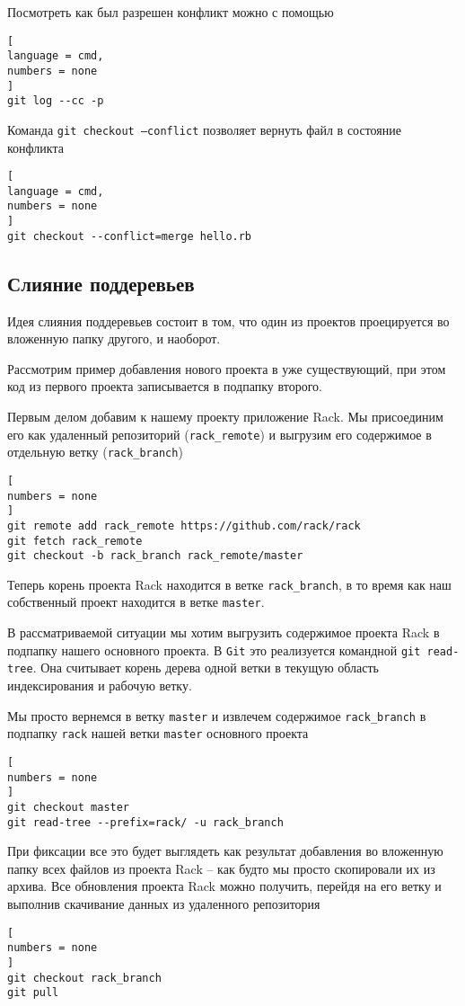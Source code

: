 \documentclass[%
	11pt,
	a4paper,
	utf8,
		]{article}
\begin{document}
Посмотреть как был разрешен конфликт можно с помощью 
\begin{lstlisting}[
language = cmd,
numbers = none
]
git log --cc -p
\end{lstlisting}

Команда \texttt{git checkout --conflict} позволяет вернуть файл в состояние конфликта
\begin{lstlisting}[
language = cmd,
numbers = none
]
git checkout --conflict=merge hello.rb
\end{lstlisting}

\subsection{Слияние поддеревьев}

Идея слияния поддеревьев состоит в том, что один из проектов проецируется во вложенную папку другого, и наоборот.

Рассмотрим пример добавления нового проекта в уже существующий, при этом код из первого проекта записывается в подпапку второго.

Первым делом добавим к нашему проекту приложение Rack. Мы присоединим его как удаленный репозиторий (\texttt{rack\_remote}) и выгрузим его содержимое в отдельную ветку (\texttt{rack\_branch})
\begin{lstlisting}[
numbers = none
]
git remote add rack_remote https://github.com/rack/rack
git fetch rack_remote
git checkout -b rack_branch rack_remote/master
\end{lstlisting}

Теперь корень проекта Rack находится в ветке \texttt{rack\_branch}, в то время как наш собственный проект находится в ветке \texttt{master}.

В рассматриваемой ситуации мы хотим выгрузить содержимое проекта Rack в подпапку нашего основного проекта. В \texttt{Git} это реализуется командной \texttt{git read-tree}. Она считывает корень дерева одной ветки в текущую область индексирования и рабочую ветку.

Мы просто вернемся в ветку \texttt{master} и извлечем содержимое \texttt{rack\_branch} в подпапку \texttt{rack} нашей ветки \texttt{master} основного проекта
\begin{lstlisting}[
numbers = none
]
git checkout master
git read-tree --prefix=rack/ -u rack_branch
\end{lstlisting}

При фиксации все это будет выглядеть как результат добавления во вложенную папку всех файлов из проекта Rack -- как будто мы просто скопировали их из архива. Все обновления проекта Rack можно получить, перейдя на его ветку и выполнив скачивание данных из удаленного репозитория
\begin{lstlisting}[
numbers = none
]
git checkout rack_branch
git pull
\end{lstlisting}
\end{document}
